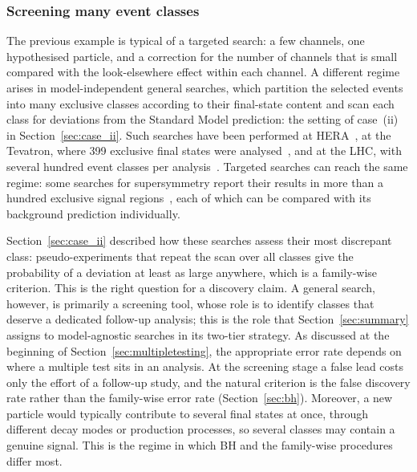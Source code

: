 \subsubsection{Screening many event classes}\label{sec:exp_screening}
The previous example is typical of a targeted search: a few channels, one hypothesised particle, and a correction for the number of channels that is small compared with the look-elsewhere effect within each channel. A different regime arises in model-independent general searches, which partition the selected events into many exclusive classes according to their final-state content and scan each class for deviations from the Standard Model prediction: the setting of case~(ii) in Section~\ref{sec:case_ii}. Such searches have been performed at HERA~\cite{aaron2009general}, at the Tevatron, where 399 exclusive final states were analysed~\cite{CDF:2008voc}, and at the LHC, with several hundred event classes per analysis~\cite{ATLAS:2018zdn,CMS:2020zjg}. Targeted searches can reach the same regime: some searches for supersymmetry report their results in more than a hundred exclusive signal regions~\cite{sirunyan2019search}, each of which can be compared with its background prediction individually.

Section~\ref{sec:case_ii} described how these searches assess their most discrepant class: pseudo-experiments that repeat the scan over all classes give the probability of a deviation at least as large anywhere, which is a family-wise criterion. This is the right question for a discovery claim. A general search, however, is primarily a screening tool, whose role is to identify classes that deserve a dedicated follow-up analysis; this is the role that Section~\ref{sec:summary} assigns to model-agnostic searches in its two-tier strategy. As discussed at the beginning of Section~\ref{sec:multipletesting}, the appropriate error rate depends on where a multiple test sits in an analysis. At the screening stage a false lead costs only the effort of a follow-up study, and the natural criterion is the false discovery rate rather than the family-wise error rate (Section~\ref{sec:bh}). Moreover, a new particle would typically contribute to several final states at once, through different decay modes or production processes, so several classes may contain a genuine signal. This is the regime in which BH and the family-wise procedures differ most.

